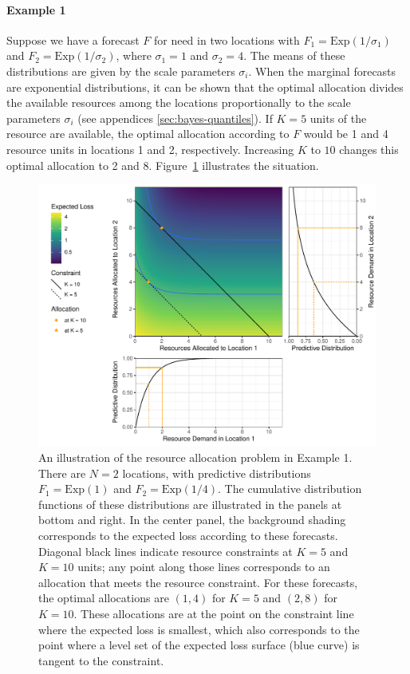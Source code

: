 \documentclass{article}\usepackage[]{graphicx}\usepackage[]{xcolor}
\begin{document}
\paragraph{Example 1} Suppose we have a forecast $F$ for need in two locations with $F_1 = \mathrm{Exp}(1 / \sigma_1)$
and $F_2 = \mathrm{Exp}(1 / \sigma_2)$, where $\sigma_1 = 1$ and $\sigma_2 = 4$. The means of these distributions are
given by the scale parameters $\sigma_i$. When the marginal forecasts are exponential distributions, it can be shown
that the optimal allocation divides the available resources among the locations proportionally to the scale parameters
$\sigma_i$ (see appendices \ref{sec:bayes-quantiles}). If $K = 5$ units of the resource are
available, the optimal allocation according to $F$ would be 1 and 4 resource units in locations 1 and 2, respectively. 
Increasing $K$ to $10$ changes this optimal allocation to 2 and 8. Figure~\ref{fig:exp_alloc_example} illustrates the 
situation.

\begin{figure}
    \includegraphics[width=\textwidth]{../figures/exponential_pred_expected_loss.pdf}
    \caption{An illustration of the resource allocation problem in Example 1. There are $N = 2$ locations, with
    predictive distributions $F_1 = \mathrm{Exp}(1)$ and $F_2 = \mathrm{Exp}(1/4)$. The cumulative distribution
    functions of these distributions are illustrated in the panels at bottom and right. In the center panel, the
    background shading corresponds to the expected loss according to these forecasts. Diagonal black lines indicate
    resource constraints at $K=5$ and $K=10$ units; any point along those lines corresponds to an allocation that meets
    the resource constraint. For these forecasts, the optimal allocations are $(1, 4)$ for $K=5$ and $(2, 8)$ for
    $K=10$. These allocations are at the point on the constraint line where the expected loss is smallest, which also
    corresponds to the point where a level set of the expected loss surface (blue curve) is tangent to the constraint.}
    \label{fig:exp_alloc_example}
\end{figure}
\end{document}
